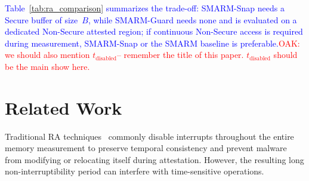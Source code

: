 \documentclass[conference]{IEEEtran}
\newcommand{\tdis}{$t_{\mathrm{disabled}}$\xspace}
\newcommand{\smarmcopy}{SMARM-Snap\xspace}
\newcommand{\smarmlock}{SMARM-Guard\xspace}
\newcommand\oak[1]{\textcolor{red}{OAK: #1}}
\newcommand\ben[1]{\textcolor{blue}{#1}}
\begin{document}





\ben{Table~\ref{tab:ra_comparison} summarizes the trade-off: \smarmcopy{} needs a Secure buffer of size~$B$, while \smarmlock{} needs none and is evaluated on a dedicated Non-Secure attested region; if continuous Non-Secure access is required during measurement, \smarmcopy{} or the SMARM baseline is preferable.}\oak{we should also mention \tdis -- remember the title of this paper. \tdis should be the main show here.}

\section{Related Work}
\label{sec:related}

Traditional RA techniques~\cite{eldefrawy2012smart,nunes2019vrased,eldefrawy2017hydra} commonly disable interrupts throughout the entire memory measurement to preserve temporal consistency and prevent malware from modifying or relocating itself during attestation. However, the resulting long non-interruptibility period can interfere with time-sensitive operations.
\end{document}
